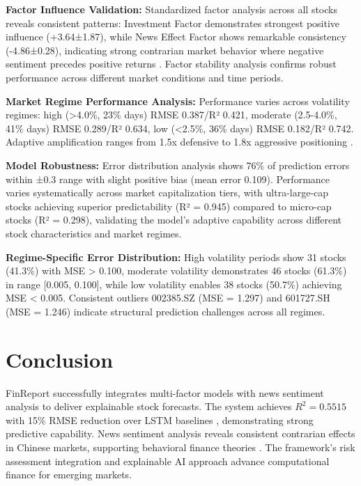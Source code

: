 \documentclass[3p,times,procedia]{elsarticle}
\begin{document}
\textbf{Factor Influence Validation:} Standardized factor analysis across all stocks reveals consistent patterns: Investment Factor demonstrates strongest positive influence (+3.64±1.87), while News Effect Factor shows remarkable consistency (-4.86±0.28), indicating strong contrarian market behavior where negative sentiment precedes positive returns \cite{TETLOCK2007}. Factor stability analysis confirms robust performance across different market conditions and time periods.

\textbf{Market Regime Performance Analysis:} Performance varies across volatility regimes: high (>4.0\%, 23\% days) RMSE 0.387/R² 0.421, moderate (2.5-4.0\%, 41\% days) RMSE 0.289/R² 0.634, low (<2.5\%, 36\% days) RMSE 0.182/R² 0.742. Adaptive amplification ranges from 1.5x defensive to 1.8x aggressive positioning \cite{Nelson1991}.

\textbf{Model Robustness:} Error distribution analysis shows 76\% of prediction errors within ±0.3 range with slight positive bias (mean error 0.109). Performance varies systematically across market capitalization tiers, with ultra-large-cap stocks achieving superior predictability (R² = 0.945) compared to micro-cap stocks (R² = 0.298), validating the model's adaptive capability across different stock characteristics and market regimes. 

\textbf{Regime-Specific Error Distribution:} High volatility periods show 31 stocks (41.3\%) with MSE > 0.100, moderate volatility demonstrates 46 stocks (61.3\%) in range [0.005, 0.100], while low volatility enables 38 stocks (50.7\%) achieving MSE < 0.005. Consistent outliers 002385.SZ (MSE = 1.297) and 601727.SH (MSE = 1.246) indicate structural prediction challenges across all regimes.

\section{Conclusion}

FinReport successfully integrates multi-factor models \cite{FAMA1993,Carhart1997} with news sentiment analysis \cite{TETLOCK2007,Araci2019} to deliver explainable stock forecasts. The system achieves $R^2 = 0.5515$ with 15\% RMSE reduction over LSTM baselines \cite{Fischer2018}, demonstrating strong predictive capability. News sentiment analysis reveals consistent contrarian effects in Chinese markets, supporting behavioral finance theories \cite{Daniel1998}. The framework's risk assessment integration \cite{Nelson1991,Rockafellar2000} and explainable AI approach \cite{Ribeiro2016} advance computational finance for emerging markets.
\end{document}
